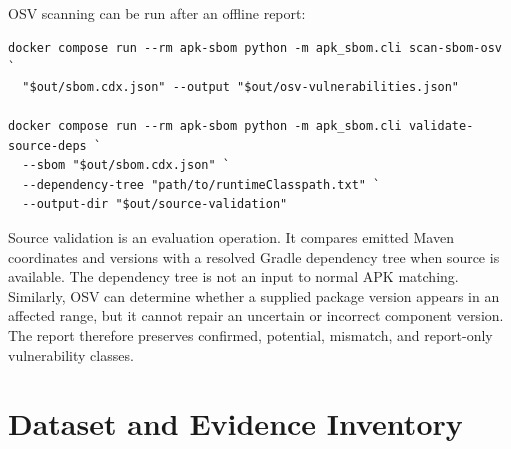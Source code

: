 OSV scanning can be run after an offline report:

\begin{lstlisting}[style=thesiscode,
caption={OSV enrichment and source validation.}]
docker compose run --rm apk-sbom python -m apk_sbom.cli scan-sbom-osv `
  "$out/sbom.cdx.json" --output "$out/osv-vulnerabilities.json"

docker compose run --rm apk-sbom python -m apk_sbom.cli validate-source-deps `
  --sbom "$out/sbom.cdx.json" `
  --dependency-tree "path/to/runtimeClasspath.txt" `
  --output-dir "$out/source-validation"
\end{lstlisting}

Source validation is an evaluation operation. It compares emitted Maven
coordinates and versions with a resolved Gradle dependency tree when source
is available. The dependency tree is not an input to normal APK matching.
Similarly, OSV can determine whether a supplied package version appears in an
affected range, but it cannot repair an uncertain or incorrect component
version. The report therefore preserves confirmed, potential, mismatch, and
report-only vulnerability classes.

\section{Dataset and Evidence Inventory}

